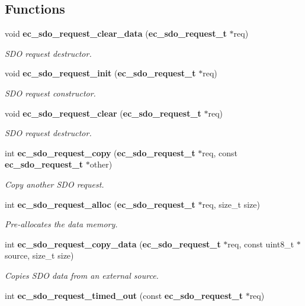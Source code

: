 \subsection*{\-Functions}
\begin{DoxyCompactItemize}
\item 
void {\bf ec\-\_\-sdo\-\_\-request\-\_\-clear\-\_\-data} ({\bf ec\-\_\-sdo\-\_\-request\-\_\-t} $\ast$req)
\begin{DoxyCompactList}\small\item\em \-S\-D\-O request destructor. \end{DoxyCompactList}\item 
void {\bf ec\-\_\-sdo\-\_\-request\-\_\-init} ({\bf ec\-\_\-sdo\-\_\-request\-\_\-t} $\ast$req)
\begin{DoxyCompactList}\small\item\em \-S\-D\-O request constructor. \end{DoxyCompactList}\item 
void {\bf ec\-\_\-sdo\-\_\-request\-\_\-clear} ({\bf ec\-\_\-sdo\-\_\-request\-\_\-t} $\ast$req)
\begin{DoxyCompactList}\small\item\em \-S\-D\-O request destructor. \end{DoxyCompactList}\item 
int {\bf ec\-\_\-sdo\-\_\-request\-\_\-copy} ({\bf ec\-\_\-sdo\-\_\-request\-\_\-t} $\ast$req, const {\bf ec\-\_\-sdo\-\_\-request\-\_\-t} $\ast$other)
\begin{DoxyCompactList}\small\item\em \-Copy another \-S\-D\-O request. \end{DoxyCompactList}\item 
int {\bf ec\-\_\-sdo\-\_\-request\-\_\-alloc} ({\bf ec\-\_\-sdo\-\_\-request\-\_\-t} $\ast$req, size\-\_\-t size)
\begin{DoxyCompactList}\small\item\em \-Pre-\/allocates the data memory. \end{DoxyCompactList}\item 
int {\bf ec\-\_\-sdo\-\_\-request\-\_\-copy\-\_\-data} ({\bf ec\-\_\-sdo\-\_\-request\-\_\-t} $\ast$req, const uint8\-\_\-t $\ast$source, size\-\_\-t size)
\begin{DoxyCompactList}\small\item\em \-Copies \-S\-D\-O data from an external source. \end{DoxyCompactList}\item 
int {\bf ec\-\_\-sdo\-\_\-request\-\_\-timed\-\_\-out} (const {\bf ec\-\_\-sdo\-\_\-request\-\_\-t} $\ast$req)

\end{DoxyCompactItemize}
